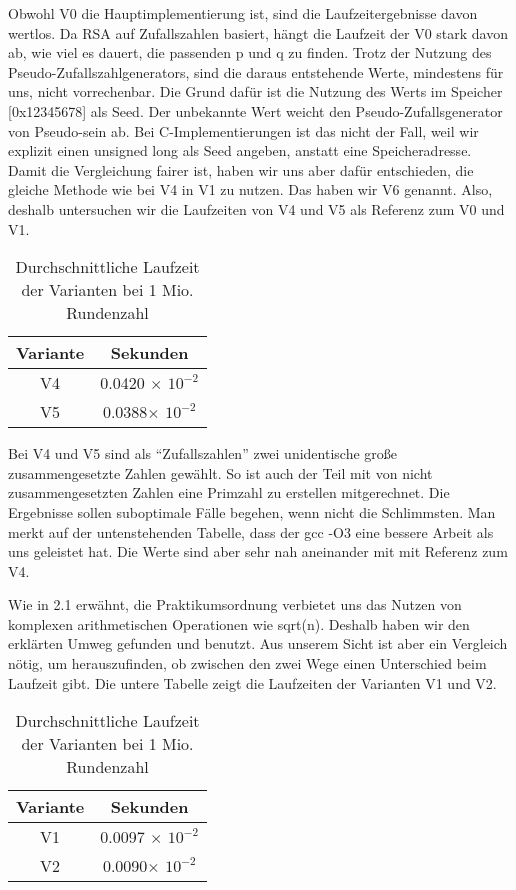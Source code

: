 \documentclass[course=asp]{aspdoc}
\begin{document}
Obwohl V0 die Hauptimplementierung ist, sind die Laufzeitergebnisse davon wertlos. Da RSA auf Zufallszahlen basiert, hängt die Laufzeit der V0 stark davon ab, wie viel es dauert, die passenden p und q zu finden. Trotz der Nutzung des Pseudo-Zufallszahlgenerators, sind die daraus entstehende Werte, mindestens für uns, nicht vorrechenbar. Die Grund dafür ist die Nutzung des Werts im Speicher [0x12345678] als Seed. Der unbekannte Wert weicht den Pseudo-Zufallsgenerator von Pseudo-sein ab. Bei C-Implementierungen ist das nicht der Fall, weil wir explizit einen unsigned long als Seed angeben, anstatt eine Speicheradresse. Damit die Vergleichung fairer ist, haben wir uns aber dafür entschieden, die gleiche Methode wie bei V4 in V1 zu nutzen. Das haben wir V6 genannt. Also, deshalb untersuchen wir die Laufzeiten von V4 und V5 als Referenz zum V0 und V1.

\begin{table}[H]
\centering
   \begin{tabular}{||c c||} 
 \hline
 Variante & Sekunden   \\ [0.5ex] 
 \hline\hline
 V4 & 0.0420 $\times $ $10^{-2}$  \\ 
 \hline
 V5 & 0.0388$\times $ $10^{-2}$   \\ [1ex] 
 \hline

\end{tabular}
    \caption{Durchschnittliche Laufzeit der Varianten bei 1 Mio. Rundenzahl}
\end{table}

Bei V4 und V5 sind als “Zufallszahlen” zwei unidentische große zusammengesetzte Zahlen gewählt. So ist auch der Teil mit von nicht zusammengesetzten Zahlen eine Primzahl zu erstellen mitgerechnet. Die Ergebnisse sollen suboptimale Fälle begehen, wenn nicht die Schlimmsten. Man merkt auf der untenstehenden Tabelle, dass der gcc -O3 eine bessere Arbeit als uns geleistet hat. Die Werte sind aber sehr nah aneinander mit mit Referenz zum V4.

Wie in 2.1 erwähnt, die Praktikumsordnung verbietet uns das Nutzen von komplexen arithmetischen Operationen wie sqrt(n). Deshalb haben wir den erklärten Umweg gefunden und benutzt. Aus unserem Sicht ist aber ein Vergleich nötig, um herauszufinden, ob zwischen den zwei Wege einen Unterschied beim Laufzeit gibt. Die untere Tabelle zeigt die Laufzeiten der Varianten V1 und V2.

\begin{table}[H]
\centering
   \begin{tabular}{||c c||} 
 \hline
 Variante & Sekunden   \\ [0.5ex] 
 \hline\hline
 V1 & 0.0097 $\times $ $10^{-2}$  \\ 
 \hline
 V2 & 0.0090$\times $ $10^{-2}$   \\ [1ex] 
 \hline

\end{tabular}
    \caption{Durchschnittliche Laufzeit der Varianten bei 1 Mio. Rundenzahl}
\end{table}
\end{document}
